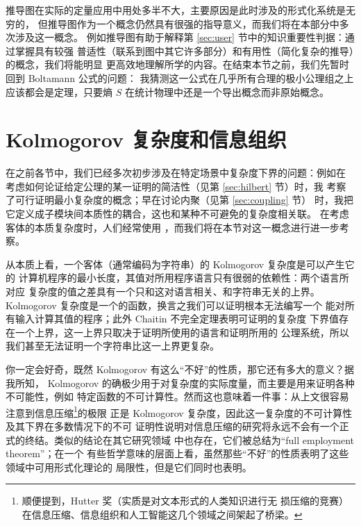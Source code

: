 推导图在实际的定量应用中用处多半不大，主要原因是此时涉及的形式化系统是无穷的，
但推导图作为一个概念仍然具有很强的指导意义，而我们将在本部分中多次涉及这一概念。
例如推导图有助于解释第 \ref{sec:user} 节中的知识重要性判据：通过掌握具有较强
普适性（联系到图中其它许多部分）和有用性（简化复杂的推导）的概念，我们将能明显
更高效地理解所学的内容。在结束本节之前，我们先暂时回到 Boltamann 公式的问题：
我猜测这一公式在几乎所有合理的极小公理组之上应该都会是定理，只要熵 $S$
在统计物理中还是一个导出概念而非原始概念。

\section{Kolmogorov 复杂度和信息组织}\label{sec:kolmogorov}

在之前各节中，我们已经多次初步涉及在特定场景中复杂度下界的问题：例如在
考虑如何论证给定公理的某一证明的简洁性（见第 \ref{sec:hilbert} 节）时，我
考察了可行证明最小复杂度的概念；早在讨论内聚（见第 \ref{sec:coupling} 节）
时，我把它定义成子模块间本质性的耦合，这也和某种不可避免的复杂度相关联。
在考虑客体的本质复杂度时，人们经常使用 %
，而我们将在本节对这一概念进行进一步考察。

从本质上看，一个客体（通常编码为字符串）的 Kolmogorov 复杂度是可以产生它的
计算机程序的最小长度，其值对所用程序语言只有很弱的依赖性：两个语言所对应
复杂度的值之差具有一个只和这对语言相关、和字符串无关的上界。Kolmogorov
复杂度是一个的函数，换言之我们可以证明根本无法编写一个
能对所有输入计算其值的程序；此外 Chaitin 不完全定理表明可证明的复杂度
下界值存在一个上界，这一上界只取决于证明所使用的语言和证明所用的
公理系统，所以我们甚至无法证明一个字符串比这一上界更复杂。

你一定会好奇，既然 Kolmogorov 有这么“不好”的性质，那它还有多大的意义？据我所知，
Kolmogorov 的确极少用于对复杂度的实际度量，而主要是用来证明各种不可能性，例如
特定函数的不可计算性。然而这也意味着一件事：从上文很容易注意到信息压缩\footnote%
{顺便提到，Hutter 奖（实质是对文本形式的人类知识进行无
损压缩的竞赛）在信息压缩、信息组织和人工智能这几个领域之间架起了桥梁。}的极限
正是 Kolmogorov 复杂度，因此这一复杂度的不可计算性及其下界在多数情况下的不可
证明性说明对信息压缩的研究将永远不会有一个正式的终结。类似的结论在其它研究领域
中也存在，它们被总结为“full employment theorem”；在一个
有些哲学意味的层面上看，虽然那些“不好”的性质表明了这些领域中可用形式化理论的
局限性，但是它们同时也表明。

